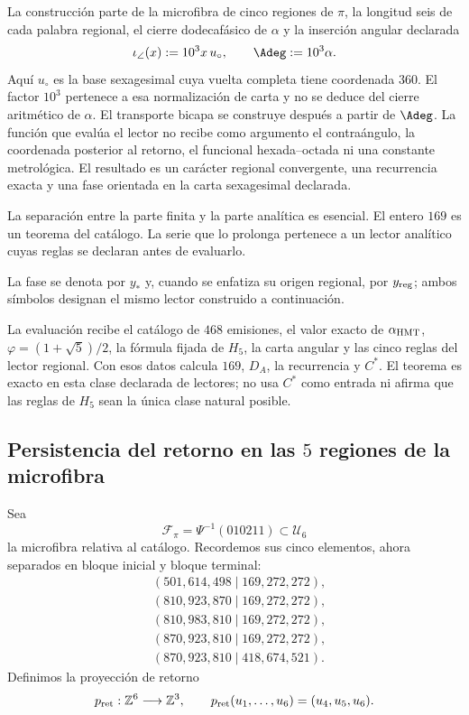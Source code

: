 La construcción parte de la microfibra de cinco regiones de \(\pi\), la
longitud seis de cada palabra regional, el cierre dodecafásico de \(\alpha\)
y la inserción angular declarada
\[
 \iota_\angle(x):=10^3x\,u_\circ,\qquad
 \Adeg:=10^3\alpha .
\]
Aquí \(u_\circ\) es la base sexagesimal cuya vuelta completa tiene
coordenada \(360\).
El factor \(10^3\) pertenece a esa normalización de carta y no se deduce del
cierre aritmético de \(\alpha\). El transporte bicapa se construye después
a partir de \(\Adeg\). La función que evalúa el lector no recibe como
argumento el contraángulo, la coordenada posterior al retorno, el funcional
hexada--octada ni una constante metrológica. El resultado es un carácter
regional convergente, una recurrencia exacta y una fase orientada en la carta
sexagesimal declarada.

La separación entre la parte finita y la parte analítica es esencial. El
entero \(169\) es un teorema del catálogo. La serie que lo prolonga pertenece
a un lector analítico cuyas reglas se declaran antes de evaluarlo.

La fase se denota por \(y_*\) y, cuando se enfatiza su origen regional, por
\(y_{\rm reg}\); ambos símbolos designan el mismo lector construido a
continuación.


La evaluación recibe el catálogo de \(468\) emisiones, el valor exacto de
\(\alpha_{\rm HMT}\), \(\varphi=(1+\sqrt5)/2\), la fórmula fijada de \(H_5\),
la carta angular y las cinco reglas del lector regional. Con esos datos
calcula \(169\), \(D_A\), la recurrencia y \(C^*\). El teorema es exacto en
esta clase declarada de lectores; no usa \(C^*\) como entrada ni afirma que
las reglas de \(H_5\) sean la única clase natural posible.

\subsection{Persistencia del retorno en las \texorpdfstring{\(5\)}{5} regiones de la microfibra}
\label{sec:s102:c38:2:2}


Sea
\[
\mathcal F_\pi=\Psi^{-1}(010211)\subset\mathcal U_6
\]
la microfibra relativa al catálogo. Recordemos sus cinco elementos, ahora
separados en bloque inicial y bloque terminal:
\[
\begin{aligned}
 &(501,614,498\mid169,272,272),\\
 &(810,923,870\mid169,272,272),\\
 &(810,983,810\mid169,272,272),\\
 &(870,923,810\mid169,272,272),\\
 &(870,923,810\mid418,674,521).
\end{aligned}
\]
Definimos la proyección de retorno
\[
p_{\rm ret}:\mathbb Z^6\longrightarrow\mathbb Z^3,
\qquad
p_{\rm ret}(u_1,\ldots,u_6)=(u_4,u_5,u_6).
\]

